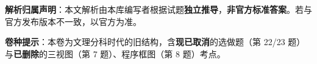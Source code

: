 

\begin{gknotice}
\textbf{ 解析归属声明}：本文解析由本库编写者根据试题\textbf{独立推导}，\textbf{非官方标准答案}。若与官方发布版本不一致，以官方为准。

\textbf{ 卷种提示}：本卷为文理分科时代的旧结构，含\textbf{现已取消}的选做题（第 22/23 题）与\textbf{已删除}的三视图（第 7 题）、程序框图（第 8 题）考点。
\end{gknotice}

\par\medskip


